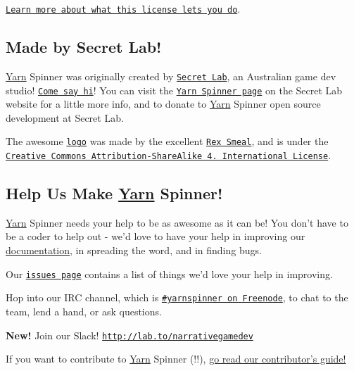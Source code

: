 \begin{DoxyItemize}
\item \href{https://tldrlegal.com/license/mit-license}{\tt Learn more about what this license lets you do}.
\end{DoxyItemize}

\subsection*{Made by Secret Lab!}

\hyperlink{a00026}{Yarn} Spinner was originally created by \href{http://secretlab.com.au}{\tt Secret Lab}, an Australian game dev studio! \href{https://twitter.com/thesecretlab}{\tt Come say hi}! You can visit the \href{http://www.secretlab.com.au/yarnspinner}{\tt Yarn Spinner page} on the Secret Lab website for a little more info, and to donate to \hyperlink{a00026}{Yarn} Spinner open source development at Secret Lab.

The awesome \href{Documentation/YarnSpinnerLogo.png}{\tt logo} was made by the excellent \href{https://twitter.com/RexSmeal}{\tt Rex Smeal}, and is under the \href{http://creativecommons.org/licenses/by-sa/4.0/}{\tt Creative Commons Attribution-\/\-Share\-Alike 4. International License}.

\subsection*{Help Us Make \hyperlink{a00026}{Yarn} Spinner!}

\hyperlink{a00026}{Yarn} Spinner needs your help to be as awesome as it can be! You don't have to be a coder to help out -\/ we'd love to have your help in improving our \hyperlink{a00012}{documentation}, in spreading the word, and in finding bugs.


\begin{DoxyItemize}
\item Our \href{https://github.com/thesecretlab/YarnSpinner/issues}{\tt issues page} contains a list of things we'd love your help in improving.
\item Hop into our I\-R\-C channel, which is \href{https://webchat.freenode.net/?channels=yarnspinner}{\tt \#yarnspinner on Freenode}, to chat to the team, lend a hand, or ask questions.
\item {\bfseries New!} Join our Slack! \href{http://lab.to/narrativegamedev}{\tt http\-://lab.\-to/narrativegamedev}
\end{DoxyItemize}

If you want to contribute to \hyperlink{a00026}{Yarn} Spinner (!!), \hyperlink{a00002}{go read our contributor's guide!} 